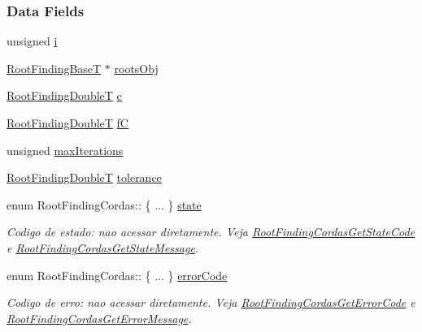 \subsubsection*{Data Fields}
\begin{CompactItemize}
\item 
unsigned \hyperlink{structRootFindingCordas_9715b440ec8443bdfda3ac2d7b388d14}{i}
\item 
\hyperlink{structRootFindingBase}{RootFindingBaseT} $\ast$ \hyperlink{structRootFindingCordas_1bb5c50ec0b0e10e0bec0f8eda8df978}{rootsObj}
\item 
\hyperlink{RootFindingCommon_8h_a296fe63994e03408c4ad62794d472e9}{RootFindingDoubleT} \hyperlink{structRootFindingCordas_b7ab045a5074411ab780f33d934de627}{c}
\item 
\hyperlink{RootFindingCommon_8h_a296fe63994e03408c4ad62794d472e9}{RootFindingDoubleT} \hyperlink{structRootFindingCordas_36d104146b164a3da07f9d3f60a04506}{fC}
\item 
unsigned \hyperlink{structRootFindingCordas_1823f4e1787202f918fdd00f95792d1f}{maxIterations}
\item 
\hyperlink{RootFindingCommon_8h_a296fe63994e03408c4ad62794d472e9}{RootFindingDoubleT} \hyperlink{structRootFindingCordas_692d6a123f5a6e5d42081bee02560f45}{tolerance}
\item 
enum RootFindingCordas:: \{ ... \}  \hyperlink{structRootFindingCordas_1cf4fb48b5b925ba6ff392679e98ffec}{state}
\begin{CompactList}\small\item\em Codigo de estado: nao acessar diretamente. Veja \hyperlink{group____cordas_g67aaf428f922e7d15a7fbd5a4508ffd7}{RootFindingCordasGetStateCode} e \hyperlink{group____cordas_ga065f13f2ec77b2e949190c1aca9ef9d}{RootFindingCordasGetStateMessage}. \item\end{CompactList}\item 
enum RootFindingCordas:: \{ ... \}  \hyperlink{structRootFindingCordas_237764d1db5221c0fb51189ae84b626a}{errorCode}
\begin{CompactList}\small\item\em Codigo de erro: nao acessar diretamente. Veja \hyperlink{group____cordas_gcc4b8454f6664e389c484498f42c17d8}{RootFindingCordasGetErrorCode} e \hyperlink{group____cordas_g5a6750a998093e1701c8a01ae24e9cc2}{RootFindingCordasGetErrorMessage}. \item\end{CompactList}\end{CompactItemize}


